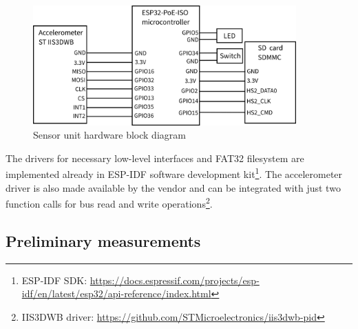 \begin{figure}[h]
	\centering
	\includegraphics[width=0.9\textwidth]{assets/design/hw-block-schematic.png}
	\caption{Sensor unit hardware block diagram}
	\label{fig:design:block-diagram-hw}
\end{figure}

The drivers for necessary low-level interfaces and FAT32 filesystem are  implemented already in ESP-IDF software development kit\footnote{ESP-IDF SDK: \url{https://docs.espressif.com/projects/esp-idf/en/latest/esp32/api-reference/index.html}}. The accelerometer driver is also made available by the vendor and can be integrated with just two function calls for bus read and write operations\footnote{IIS3DWB driver: \url{https://github.com/STMicroelectronics/iis3dwb-pid}}.

\subsection{Preliminary measurements}

